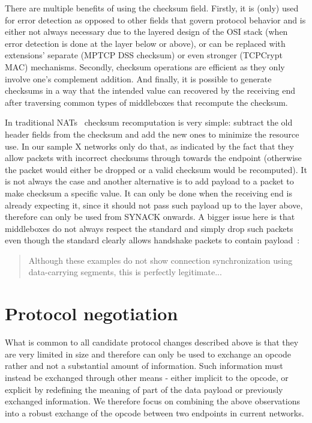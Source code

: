 \documentclass{sig-alternate-10pt}
\begin{document}
There are multiple benefits of using the checksum field. Firstly, it is (only) used for error detection as opposed to other fields that govern protocol behavior and is either not always necessary due to the layered design of the OSI stack (when error detection is done at the layer below or above), or can be replaced with extensions' separate (MPTCP DSS checksum) or even stronger (TCPCrypt MAC) mechanisms. Secondly, checksum operations are efficient as they only involve one's complement addition. And finally, it is possible to generate checksums in a way that the intended value can recovered by the receiving end after traversing common types of middleboxes that recompute the checksum.

In traditional NATs~\cite{Egevang:tu} checksum recomputation is very simple: subtract the old header fields from the checksum and add the new ones to minimize the resource use. In our sample X networks only do that, as indicated by the fact that they allow packets with incorrect checksums through towards the endpoint (otherwise the packet would either be dropped or a valid checksum would be recomputed). It is not always the case and another alternative is to add payload to a packet to make checksum a specific value. It can only be done when the receiving end is already expecting it, since it should not pass such payload up to the layer above, therefore can only be used from SYNACK onwards. A bigger issue here is that middleboxes do not always respect the standard and simply drop such packets even though the standard clearly allows handshake packets to contain payload~\cite{Postel:3EDyoxP_,Chu:2011tn}:

\begin{quotation}
	Although these
	examples do not show connection synchronization using data-carrying
	segments, this is perfectly legitimate...
\end{quotation}


\section{Protocol negotiation}

What is common to all candidate protocol changes described above is that they are very limited in size and therefore can only be used to exchange an opcode rather and not a substantial amount of information. Such information must instead be exchanged through other means - either implicit to the opcode, or explicit by redefining the meaning of part of the data payload or previously exchanged information. We therefore focus on combining the above observations into a robust exchange of the opcode between two endpoints in current networks.
\end{document}
